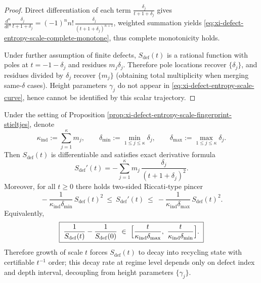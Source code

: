 \begin{proof}
Direct differentiation of each term \(\frac{\delta_j}{t+1+\delta_j}\) gives
\(
\frac{d^n}{dt^n}\frac{\delta_j}{t+1+\delta_j}
=(-1)^n n!\,\frac{\delta_j}{(t+1+\delta_j)^{n+1}}
\), weighted summation yields \eqref{eq:xi-defect-entropy-scale-complete-monotone}, thus complete monotonicity holds.
\par
Under further assumption of finite defects, \(S_{\mathrm{def}}(t)\) is a rational function
with poles at \(t=-1-\delta_j\) and residues \(m_j\delta_j\).
Therefore pole locations recover \(\{\delta_j\}\), and residues divided by \(\delta_j\) recover \(\{m_j\}\) (obtaining total multiplicity when merging same-\(\delta\) cases).
Height parameters \(\gamma_j\) do not appear in \eqref{eq:xi-defect-entropy-scale-curve}, hence cannot be identified by this scalar trajectory.
\end{proof}
\begin{proposition}\label{prop:xi-defect-entropy-riccati-sandwich}
Under the setting of Proposition \ref{prop:xi-defect-entropy-scale-fingerprint-stieltjes}, denote
\[
\kappa_{\mathrm{ind}}:=\sum_{j=1}^{\kappa}m_j,
\qquad
\delta_{\min}:=\min_{1\le j\le\kappa}\delta_j,
\qquad
\delta_{\max}:=\max_{1\le j\le\kappa}\delta_j.
\]
Then \(S_{\mathrm{def}}(t)\) is differentiable and satisfies exact derivative formula
\[
S_{\mathrm{def}}'(t)=-\sum_{j=1}^{\kappa}m_j\,\frac{\delta_j}{(t+1+\delta_j)^2}.
\]
Moreover, for all \(t\ge 0\) there holds two-sided Riccati-type pincer
\begin{equation}\label{eq:xi-defect-entropy-riccati-sandwich}
\boxed{\;
-\frac{1}{\kappa_{\mathrm{ind}}\delta_{\min}}\,S_{\mathrm{def}}(t)^2
\ \le\
S_{\mathrm{def}}'(t)
\ \le\
-\frac{1}{\kappa_{\mathrm{ind}}\delta_{\max}}\,S_{\mathrm{def}}(t)^2.\;}
\end{equation}
Equivalently,
\begin{equation}\label{eq:xi-defect-entropy-inv-linear-bracket}
\boxed{\;
\frac{1}{S_{\mathrm{def}}(t)}-\frac{1}{S_{\mathrm{def}}(0)}
\ \in\
\Bigl[\frac{t}{\kappa_{\mathrm{ind}}\delta_{\max}},\ \frac{t}{\kappa_{\mathrm{ind}}\delta_{\min}}\Bigr].\;}
\end{equation}
Therefore growth of scale \(t\) forces \(S_{\mathrm{def}}(t)\) to decay into recycling state with certifiable \(t^{-1}\) order; this decay rate at regime level depends only on defect index and depth interval, decoupling from height parameters \(\{\gamma_j\}\).
\end{proposition}
